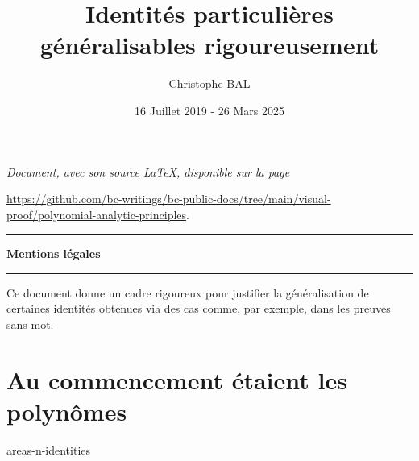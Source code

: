 \documentclass[12pt]{amsart}
\begin{document}
\title{Identités particulières généralisables rigoureusement}
\author{Christophe BAL}
\date{16 Juillet 2019 - 26 Mars 2025}

\maketitle

\begin{center}
	\itshape
	Document, avec son source \LaTeX, disponible sur la page

	\url{https://github.com/bc-writings/bc-public-docs/tree/main/visual-proof/polynomial-analytic-principles}.
\end{center}


\bigskip


\begin{center}
	\hrule\vspace{.3em}
	{
		\fontsize{1.35em}{1em}\selectfont
		\textbf{Mentions \og légales \fg}
	}

	\vspace{0.45em}
	\doclicenseThis
	\hrule
\end{center}


\bigskip


\setcounter{tocdepth}{1}
\tableofcontents




\begin{meta-abstract*}
	Ce document donne un cadre rigoureux pour justifier la généralisation de certaines identités obtenues via des cas  comme, par exemple, dans les preuves sans mot. 
\end{meta-abstract*}




\section{Au commencement étaient les polynômes}

{areas-n-identities}




%
%
\end{document}
